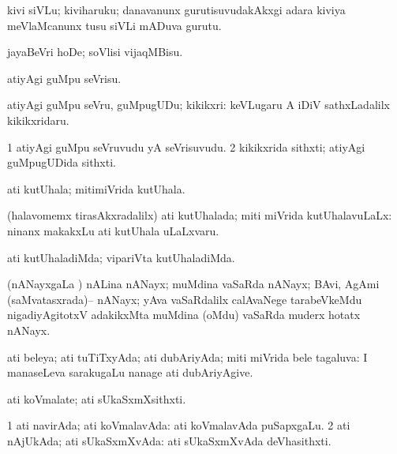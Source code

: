 \bentry
{}
\gl{\nA}
\bmng
kivi siVLu; kiviharuku; danavanunx gurutisuvudakAkxgi adara kiviya meVlaMcanunx tusu siVLi mADuva gurutu. 
\emng
\eentry

\bentry
{}
\gl{\sakirx}
\bmng
jayaBeVri hoDe; soVlisi vijaqMBisu. 
\emng
\eentry

\bentry
{}
\gl{\sakirx}
\bmng
atiyAgi guMpu seVrisu. 
\emng

\noindent
\gl{\akirx}
\bmng
atiyAgi guMpu seVru, guMpugUDu; kikikxri:  keVLugaru A iDiV sathxLadalilx kikikxridaru. 
\emng
\eentry

\bentry
{}
\gl{\nA}
\bmng
\bnum
\num{1} atiyAgi guMpu seVruvudu yA seVrisuvudu. 
\num{2} kikikxrida sithxti; atiyAgi guMpugUDida sithxti. 
\enum
\emng
\eentry

\bentry
{}
\gl{\nA}
\bmng
ati kutUhala; mitimiVrida kutUhala. 
\emng
\eentry

\bentry
{}
\gl{\gu}
\bmng
(halavomemx tirasAkxradalilx) ati kutUhalada; miti miVrida kutUhalavuLaLx:  ninanx makakxLu ati kutUhala uLaLxvaru. 
\emng
\eentry

\bentry
{}
\gl{\kirxvi}
\bmng
ati kutUhaladiMda; vipariVta kutUhaladiMda. 
\emng
\eentry

\bentry
{}
\gl{\nA}
\bmng
(nANayxgaLa \vi) nALina nANayx; muMdina vaSaRda nANayx; BAvi, AgAmi (saMvatasxrada)-- nANayx; yAva vaSaRdalilx calAvaNege tarabeVkeMdu nigadiyAgitotxV adakikxMta muMdina (oMdu) vaSaRda muderx hotatx nANayx. 
\emng
\eentry

\bentry
{}
\gl{\gu}
\bmng
ati beleya; ati tuTiTxyAda; ati dubAriyAda; miti miVrida bele tagaluva:  I manaseLeva sarakugaLu nanage ati dubAriyAgive. 
\emng
\eentry

\bentry
{}
\gl{\nA}
\bmng
ati koVmalate; ati sUkaSxmXsithxti. 
\emng
\eentry

\bentry
{}
\gl{\gu}
\bmng
\bnum
\num{1} ati navirAda; ati koVmalavAda:  ati koVmalavAda puSapxgaLu. 
\num{2} ati nAjUkAda; ati sUkaSxmXvAda:  ati sUkaSxmXvAda deVhasithxti. 
\enum
\emng
\eentry

